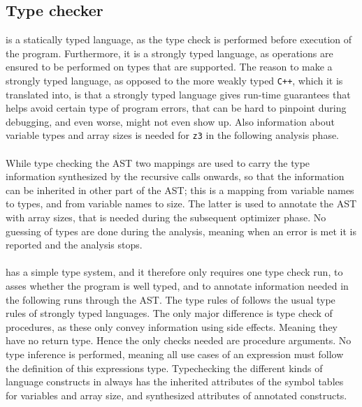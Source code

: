 \subsection{Type checker}
\lan is a statically typed language, as the type check is performed before execution of the program.
Furthermore, it is a strongly typed language, as operations are ensured to be performed on
types that are supported. The reason to make \lan a strongly typed language, as opposed to
the more weakly typed \texttt{C++}, which it is translated into, is that a strongly typed
language gives run-time guarantees that helps avoid certain type of program errors, that can be
hard to pinpoint during debugging, and even worse, might not even show up. Also information about
variable types and array sizes is needed for \texttt{z3} in the following analysis phase.
\\
\\
While type checking the AST two mappings are used to carry the type information synthesized by the
recursive calls onwards, so that the information can be inherited in other part of the AST; this
is a mapping from variable names to types, and from variable names to size. The latter is used
to annotate the AST with array sizes, that is needed during the subsequent optimizer phase.
No guessing of types are done during the analysis, meaning when an error is met it is reported
and the analysis stops.
\\
\\
\lan has a simple type system, and it therefore only requires one type check run, to asses whether
the program is well typed, and to annotate information needed in the following runs through the AST.
The type rules of \lan follows the usual type rules of strongly typed languages.
The only major difference is type check of procedures,
as these only convey information using side effects. Meaning they have no return type. Hence the
only checks needed are procedure arguments. No type inference is performed, meaning all use cases
of an expression must follow the definition of this expressions type.
Typechecking the different kinds of language constructs
in \lan always has the inherited attributes of the symbol tables for variables and array size,
and synthesized attributes of annotated constructs.



